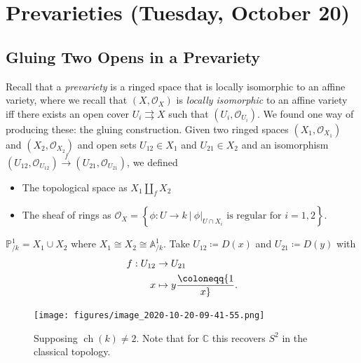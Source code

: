 \hypertarget{prevarieties-tuesday-october-20}{%
\section{Prevarieties (Tuesday, October
20)}\label{prevarieties-tuesday-october-20}}

\hypertarget{gluing-two-opens-in-a-prevariety}{%
\subsection{Gluing Two Opens in a
Prevariety}\label{gluing-two-opens-in-a-prevariety}}

Recall that a \emph{prevariety} is a ringed space that is locally
isomorphic to an affine variety, where we recall that
\((X, {\mathcal{O}}_X)\) is \emph{locally isomorphic} to an affine
variety iff there exists an open cover \(U_i \rightrightarrows X\) such
that \((U_i, {\mathcal{O}}_{U_i})\). We found one way of producing
these: the gluing construction. Given two ringed spaces
\((X_1, {\mathcal{O}}_{X_1})\) and \((X_2, {\mathcal{O}}_{X_2})\) and
open sets \(U_{12} \in X_1\) and \(U_{21} \in X_2\) and an isomorphism
\((U_{12}, {\mathcal{O}}_{U_{12}}) \xrightarrow{f} (U_{21}, {\mathcal{O}}_{U_{21}})\),
we defined

\begin{itemize}
\tightlist
\item
  The topological space as \(X_1 {\coprod}_f X_2\)
\item
  The sheaf of rings as
  \({\mathcal{O}}_X = \left\{{\phi:U\to k {~\mathrel{\Big|}~}{ \left.{{\phi}} \right|_{{U\cap X_i}} } \text{ is regular for } i=1,2 }\right\}\).
\end{itemize}

\begin{example}

\({\mathbb{P}}^1_{/k} = X_1 \cup X_2\) where
\(X_1 \cong X_2 \cong {\mathbb{A}}^1_{/k}\). Take
\(U_{12} \coloneqq D(x)\) and \(U_{21} \coloneqq D(y)\) with
\begin{align*}  
f: U_{12} &\to U_{21} \\
x &\mapsto y \coloneqq{1\over x}
.\end{align*}

\begin{figure}
\centering
\texttt{[image: figures/image\_2020-10-20-09-41-55.png]}
\caption{Supposing \(\operatorname{ch}(k) \neq 2\). Note that for
\({\mathbb{C}}\) this recovers \(S^2\) in the classical topology.}
\end{figure}

\end{example}

